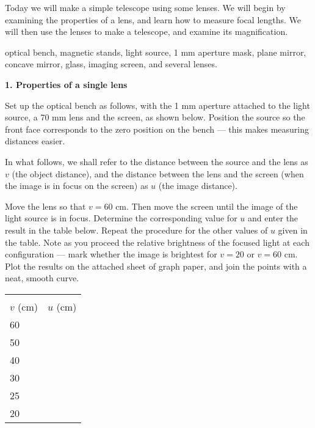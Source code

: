 
\noindent Today we will make a simple telescope using some lenses.  We
will begin by examining the properties of a lens, and learn how to
measure focal lengths. We will then use the lenses to make a
telescope, and examine its magnification.  

 optical bench, magnetic stands, light
source, 1 mm aperture mask, plane mirror, concave mirror, glass,
imaging screen, and several lenses.

\noindent
{\bf 1. Properties of a single lens} 

\noindent Set up the optical bench as follows, with the 1 mm aperture
attached to the light source, a 70 mm lens and the screen, as shown
below. Position the source so the front face corresponds to the zero
position on the bench --- this makes measuring distances easier.

\begin{figure*}[h]
\centerline{}
\caption{}
\end{figure*}

\noindent In what follows, we shall refer to the distance between the
source and the lens as $v$ (the object distance), and the distance
between the lens and the screen (when the image is in focus on the
screen) as $u$ (the image distance). 

\noindent Move the lens so that $v= 60$ cm.  Then move the screen
until the image of the light source is in focus.  Determine the
corresponding value for $u$ and enter the result in the table below.
Repeat the procedure for the other values of $u$ given in the table.
Note as you proceed the relative brightness of the focused light at
each configuration --- mark whether the image is brightest for $v=20$
or $v=60$ cm.  Plot the results on the attached sheet of graph paper,
and join the points with a neat, smooth curve.
 
\begin{center}
\begin{tabular}{lc} \hline \\ [-6pt]
$v$ (cm)  & \hspace{1cm} $u$ (cm) \hspace{1cm} \\ [6pt]
\hline
60 &        \\ \hline
50 &        \\ \hline
40 &        \\ \hline
30 &        \\ \hline
25 &        \\ \hline
20 &        \\ \hline
\end{tabular}
\end{center}


